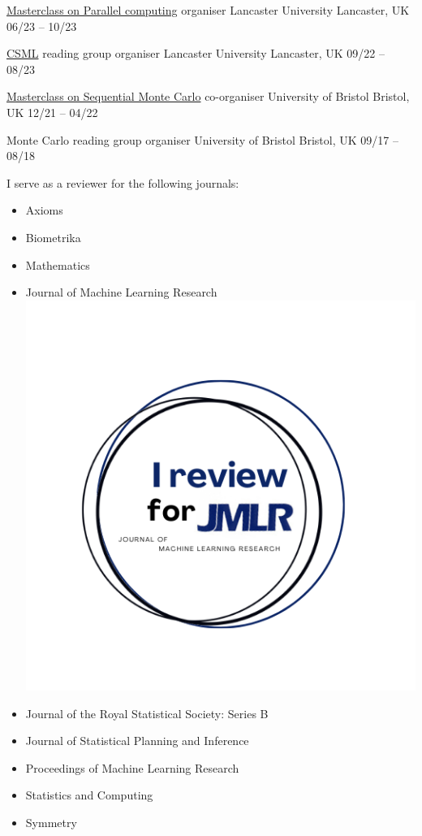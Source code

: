 


\begin{cvhonors}

		
    \cvhonor
    {\href{https://www.lancaster.ac.uk/bayes-for-health/news/masterclass-in-parallel-computing}{Masterclass on Parallel computing} organiser}
	{Lancaster University} 
	{Lancaster, UK}
	{06\slash 23 -- 10\slash 23}
 
    \cvhonor
    {\href{https://lu-csml.github.io/}{CSML} reading group organiser}
	{Lancaster University} 
	{Lancaster, UK}
	{09\slash 22 -- 08\slash23}
	
    \cvhonor
    {\href{https://www.lancaster.ac.uk/bayes-for-health/news/joine-bayes4health-and-cosines-masterclass}{Masterclass on Sequential Monte Carlo} co-organiser}
	{University of Bristol} 
	{Bristol, UK}
	{12\slash 21 -- 04\slash 22}
	
    \cvhonor
    {Monte Carlo reading group organiser}
	{University of Bristol} 
	{Bristol, UK}
	{09\slash 17 -- 08\slash 18}

\end{cvhonors}

\begin{small} \color{black}

I serve as a reviewer for the following journals:
\vspace{-0.125cm}
\begin{itemize}
    \item Axioms
    \item Biometrika
    \item Mathematics
    \item Journal of Machine Learning Research \includegraphics[width=.125in]{cv/figure/JMLR.png}
    \item Journal of the Royal Statistical Society: Series B
    \item Journal of Statistical Planning and Inference
    \item Proceedings of Machine Learning Research
    \item Statistics and Computing
    \item Symmetry
\end{itemize}
\end{small}

